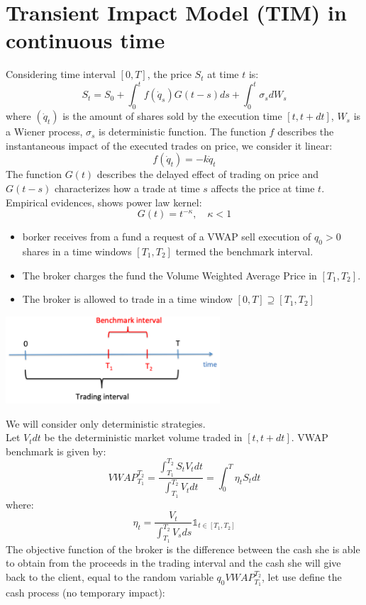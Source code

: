 \section{Transient Impact Model (TIM) in continuous time}
Considering time interval $[0,T]$, the price $S_t$ at time $t$ is:
\[
S_t = S_0 + \int_{0}^{t} f(\dot{q}_s) G(t-s)ds + \int_0^t \sigma_sdW_s 
\]
where $(\dot{q}_t)$ is the amount of shares sold by the execution time $[t,t+dt]$, $W_s$ is a Wiener process, $\sigma_s$ is deterministic function. The function $f$ describes the instantaneous impact of the executed trades on price, we consider it linear:
\[
f(\dot{q}_t) = -k \dot{q}_t
\]
The function $G(t)$ describes the delayed effect of trading on price and $G(t-s)$ characterizes how a trade at time $s$ affects the price at time $t$.\\
Empirical evidences, shows power law kernel:
\[
G(t) = t^{-\kappa},\quad \kappa<1
\]
\begin{mysetting}
	\begin{itemize}
		\item borker receives from a fund a request of a VWAP sell execution of $q_0>0$ shares in a time windows $[T_1,T_2]$ termed the benchmark interval.
		\item The broker charges the fund the Volume Weighted Average Price in $[T_1,T_2]$.
		\item The broker is allowed to trade in a time window $[0,T] \supseteq [T_1,T_2]$
	\end{itemize}
\end{mysetting}
\begin{center}
	\includegraphics[width=0.6\textwidth]{picture/(16)setting_TIM_VWAP.png}
\end{center}
We will consider only deterministic strategies.\\
Let $V_tdt$ be the deterministic market volume traded in $[t,t+dt]$. VWAP benchmark is given by:
\[
VWAP_{T_1}^{T_2} = \frac{\int_{T_1}^{T_2} S_tV_t dt}{\int_{T_1}^{T_2} V_t dt} = \int_{0}^{T} \eta_t S_t dt
\]
where:
\[
\eta_t = \frac{V_t}{\int_{T_1}^{T_2}V_sds}\mathds{1}_{t\in [T_1,T_2]}
\]
The objective function of the broker is the difference between the cash she is able to obtain from the proceeds in the trading interval and the cash she will give back to the client, equal to the random variable $q_0VWAP_{T_1}^{T_2}$, let use define the cash process (no temporary impact):
